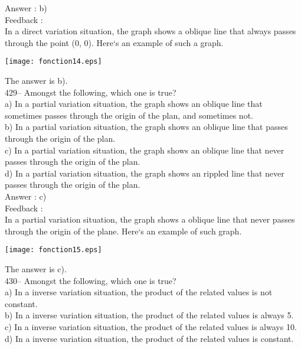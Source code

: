 ﻿\documentclass[letterpaper, 12pt]{article}
\begin{document}
Answer :  b)\\

Feedback : \\
In a direct variation situation, the graph shows a
oblique line that always passes through the point (0, 0).  Here`s an example of such a graph.\\
    \begin{center}
    \texttt{[image: fonction14.eps]}
    \end{center}

The answer is b).\\


429-- Amongst the following, which one is true?\\
a) In a partial variation situation, the graph shows an
oblique line that sometimes passes through the origin of the plan, and sometimes not.\\
b) In a partial variation situation, the graph shows an
oblique line that passes through the origin of the plan.\\
c) In a partial variation situation, the graph shows an
oblique line that never passes through the origin of the plan.\\
d) In a partial variation situation, the graph shows an
rippled line that never passes through the origin of the plan.\\

Answer :  c)\\

Feedback : \\
In a partial variation situation, the graph shows a
oblique line that never passes through the origin of the plane. Here`s an example of such graph.\\
    \begin{center}
    \texttt{[image: fonction15.eps]}
    \end{center}
The answer is c).\\


430-- Amongst the following, which one is true?\\
a) In a inverse variation situation, the product of the related values
is not constant.\\
b) In a inverse variation situation, the product of the related values
is always 5.\\
c) In a inverse variation situation, the product of the related values
is always 10.\\
d) In a inverse variation situation, the product of the related values
is constant.\\
\end{document}
